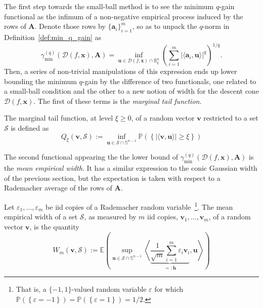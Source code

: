 The first step towards the small-ball method is to see the minimum $q$-gain functional as the infimum of a non-negative empirical process induced by the rows of $\mathbf{A}$. Denote those rows by $\{ \mathbf{a}_i \}_{i=1}^m$, so as to unpack the $q$-norm in Definition~\ref{def:min_q_gain} as
\begin{equation}
    \gamma_{\min}^{(q)} \left ( \mathcal{D}( f, \mathbf{x}), \mathbf{A} \right ) = \underset{\mathbf{u} \in \mathcal{D}(f, \mathbf{x}) \cap \mathbb{B}^{n}_q}{\inf} \left ( \sum_{i=1}^{m} | \langle \mathbf{a}_i, \mathbf{u} \rangle |^q \right )^{1/q}.
\end{equation}
Then, a series of non-trivial manipulations of this expression ends up lower bounding the minimum $q$-gain by the difference of two functionals, one related to a small-ball condition and the other to a new notion of width for the descent cone $\mathcal{D}( f, \mathbf{x})$. The first of these terms is the \emph{marginal tail function}.

\begin{definition}\label{def:marginal_tail_function}
    The marginal tail function, at level $\xi \geq 0$, of a random vector $\mathbf{v}$ restricted to a set $\mathcal{S}$ is defined as
    \begin{equation}
        Q_{\xi}(\mathbf{v}, \mathcal{S}) := \underset{\mathbf{u} \in \mathcal{S} \cap \mathbb{S}^{n-1}}{\inf} \mathbb{P} \left ( \left \{ | \langle \mathbf{v}, \mathbf{u}\rangle | \geq \xi \right \} \right )
    \end{equation}
\end{definition}

The second functional appearing the the lower bound of $\gamma_{\min}^{(q)} \left ( \mathcal{D}( f, \mathbf{x}), \mathbf{A} \right )$ is the \emph{mean empirical width}. It has a similar expression to the conic Gaussian width of the previous section, but the expectation is taken with respect to a Rademacher average of the rows of $\mathbf{A}$.

\begin{definition}\label{def:mean_empirical_width}
    Let $\varepsilon_1, \dots, \varepsilon_m$ be \acrshort{iid} copies of a Rademacher random variable~\footnote{That is, a $\{-1, 1\}$-valued random variable $\varepsilon$ for which $\mathbb{P} \left ( \left \{  \varepsilon = -1 \right \}\right ) = \mathbb{P} \left ( \left \{  \varepsilon = 1 \right \}\right ) = 1/2$.}. The mean empirical width of a set $\mathcal{S}$, as measured by $m$ \acrshort{iid} copies, $\mathbf{v}_1, \dots, \mathbf{v}_m$, of a random vector $\mathbf{v}$, is the quantity
    \begin{equation}
        W_{m}(\mathbf{v}, \mathcal{S}) := \mathbb{E} \left ( \underset{\mathbf{u} \in \mathcal{S} \cap \mathbb{S}^{n-1}}{\sup} \left \langle \underbrace{\frac{1}{\sqrt{m}} \sum_{i=1}^{m} \varepsilon_i \mathbf{v}_i}_{=:\mathbf{h}}, \mathbf{u} \right \rangle \right )
    \end{equation}
\end{definition}

